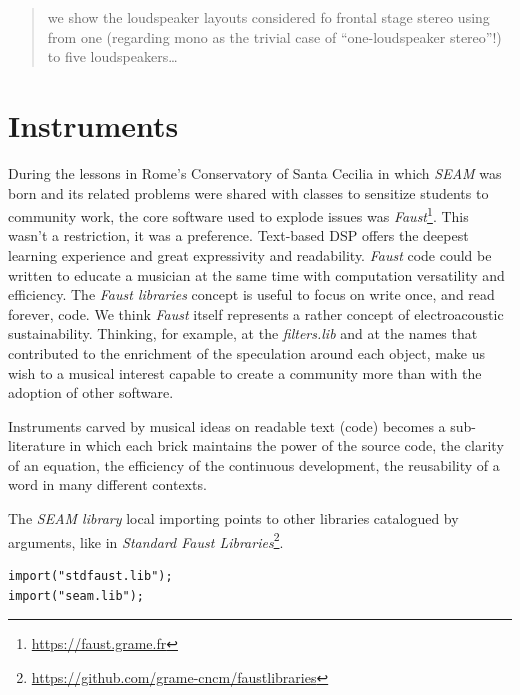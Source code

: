 \documentclass{article}
\begin{document}
\begin{quotation}
we show the loudspeaker layouts considered fo frontal stage stereo using from one (regarding mono as the trivial case of “one-loudspeaker stereo”!) to five loudspeakers… \cite{mg92pdmsss}
\end{quotation}

\section{Instruments}
\label{sec:instruments}

During the lessons in Rome's Conservatory of Santa Cecilia in which \emph{SEAM} was born and its
related problems were shared with classes to sensitize students to community
work, the core software used to explode issues was \emph{Faust}\footnote{
\url{https://faust.grame.fr}}. This wasn't a restriction, it was a preference.
Text-based DSP offers the deepest learning experience and great expressivity
and readability. \emph{Faust} code could be written to educate a musician at
the same time with computation versatility and efficiency. The \emph{Faust
libraries} concept is useful to focus on write once, and read forever, code.
We think \emph{Faust} itself represents a rather concept of electroacoustic
sustainability. Thinking, for example, at the \emph{filters.lib} and at the
names that contributed to the enrichment of  the speculation around each object, make
us wish to a musical interest capable to create a community more than with the
adoption of other software.

Instruments carved by musical ideas on readable text (code) becomes a
sub-literature in which each brick maintains the power of the source code, the
clarity of an equation, the efficiency of the continuous development, the
reusability of a word in many different contexts.

The \emph{SEAM library} local importing points to other libraries catalogued
by arguments, like in \emph{Standard Faust Libraries}\footnote{
\url{https://github.com/grame-cncm/faustlibraries}}.

\begin{lstlisting}
import("stdfaust.lib");
import("seam.lib");
\end{lstlisting}
\end{document}
